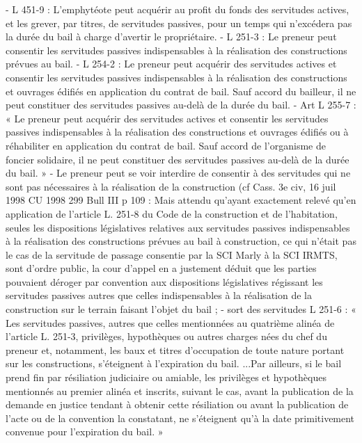 \documentclass[11pt,a4paper]{report}
\begin{document}
	- L 451-9 : L'emphytéote peut acquérir au profit du fonds des servitudes actives, et les grever, par titres, de
	servitudes passives, pour un temps qui n'excédera pas la durée du bail à charge d'avertir le propriétaire.
	- L 251-3 : Le preneur peut consentir les servitudes passives indispensables à la réalisation des constructions
	prévues au bail.
	- L 254-2 : Le preneur peut acquérir des servitudes actives et consentir les servitudes passives indispensables à
	la réalisation des constructions et ouvrages édifiés en application du contrat de bail. Sauf accord du bailleur, il
	ne peut constituer des servitudes passives au-delà de la durée du bail.
	- Art L 255-7 : « Le preneur peut acquérir des servitudes actives et consentir les servitudes passives
	indispensables à la réalisation des constructions et ouvrages édifiés ou à réhabiliter en application du contrat de
	bail. Sauf accord de l'organisme de foncier solidaire, il ne peut constituer des servitudes passives au-delà de la
	durée du bail. »
	- Le preneur peut se voir interdire de consentir à des servitudes qui ne sont pas nécessaires à la réalisation
	de la construction (cf Cass. 3e civ, 16 juil 1998 CU 1998 299 Bull III  p 109 : Mais attendu qu'ayant
	exactement relevé qu'en application de l'article L. 251-8 du Code de la construction et de l'habitation, seules les
	dispositions législatives relatives aux servitudes passives indispensables à la réalisation des constructions
	prévues au bail à construction, ce qui n'était pas le cas de la servitude de passage consentie par la SCI Marly à
	la SCI IRMTS, sont d'ordre public, la cour d'appel en a justement déduit que les parties pouvaient déroger par
	convention aux dispositions législatives régissant les servitudes passives autres que celles indispensables à la
	réalisation de la construction sur le terrain faisant l'objet du bail ;
	- sort des servitudes L 251-6 : « Les servitudes passives, autres que celles mentionnées au quatrième alinéa de
	l'article L. 251-3, privilèges, hypothèques ou autres charges nées du chef du preneur et, notamment, les baux et
	titres d'occupation de toute nature portant sur les constructions, s'éteignent à l'expiration du bail.
	...Par ailleurs, si le bail prend fin par résiliation judiciaire ou amiable, les privilèges et hypothèques mentionnés
	au premier alinéa et inscrits, suivant le cas, avant la publication de la demande en justice tendant à obtenir cette
	résiliation ou avant la publication de l'acte ou de la convention la constatant, ne s'éteignent qu'à la date
	primitivement convenue pour l'expiration du bail. »
\end{document}
